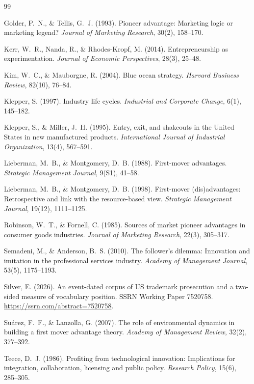 \begin{thebibliography}{99}

Golder, P.~N., \& Tellis, G.~J. (1993). Pioneer advantage: Marketing logic or
marketing legend? \emph{Journal of Marketing Research}, 30(2), 158--170.

Kerr, W.~R., Nanda, R., \& Rhodes-Kropf, M. (2014). Entrepreneurship as
experimentation. \emph{Journal of Economic Perspectives}, 28(3), 25--48.

Kim, W.~C., \& Mauborgne, R. (2004). Blue ocean strategy. \emph{Harvard
Business Review}, 82(10), 76--84.

Klepper, S. (1997). Industry life cycles. \emph{Industrial and Corporate
Change}, 6(1), 145--182.

Klepper, S., \& Miller, J.~H. (1995). Entry, exit, and shakeouts in the
United States in new manufactured products. \emph{International Journal
of Industrial Organization}, 13(4), 567--591.

Lieberman, M.~B., \& Montgomery, D.~B. (1988). First-mover advantages.
\emph{Strategic Management Journal}, 9(S1), 41--58.

Lieberman, M.~B., \& Montgomery, D.~B. (1998). First-mover (dis)advantages:
Retrospective and link with the resource-based view. \emph{Strategic
Management Journal}, 19(12), 1111--1125.

Robinson, W.~T., \& Fornell, C. (1985). Sources of market pioneer advantages
in consumer goods industries. \emph{Journal of Marketing Research}, 22(3),
305--317.

Semadeni, M., \& Anderson, B.~S. (2010). The follower's dilemma:
Innovation and imitation in the professional services industry.
\emph{Academy of Management Journal}, 53(5), 1175--1193.

Silver, E. (2026). An event-dated corpus of US trademark prosecution and
a two-sided measure of vocabulary position. SSRN Working Paper 7520758.
\url{https://ssrn.com/abstract=7520758}.

Su\'arez, F.~F., \& Lanzolla, G. (2007). The role of environmental
dynamics in building a first mover advantage theory. \emph{Academy of
Management Review}, 32(2), 377--392.

Teece, D.~J. (1986). Profiting from technological innovation:
Implications for integration, collaboration, licensing and public
policy. \emph{Research Policy}, 15(6), 285--305.

\end{thebibliography}
